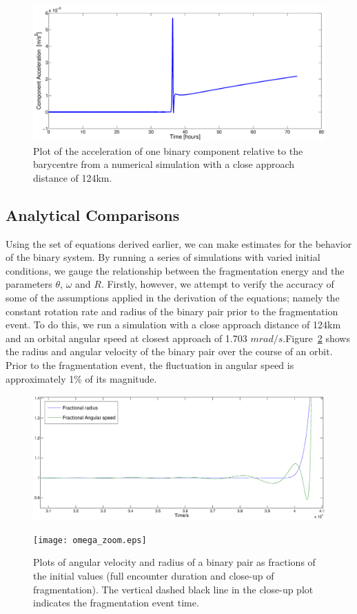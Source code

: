 \documentclass[letterpaper, preprint, paper,11pt]{AAS}	%
\begin{document}
 \begin{figure}[H]
\centering
\centerline{\includegraphics[width=1.2\textwidth]{peak_accel.eps}} 
\caption{Plot of the acceleration of one binary component relative to the barycentre from a numerical simulation
 with a close approach distance of 124km.} 
\label{fig:Num_accell}
\end{figure}

\subsection{Analytical Comparisons}

Using the set of equations derived earlier, we can make estimates for the behavior of the binary system. By running a series of simulations with varied initial conditions, we gauge the relationship between the fragmentation energy and the parameters $\theta$, $\omega$ and $R$. Firstly, however, we attempt to verify the accuracy of some of the assumptions applied in the derivation of the equations; namely the constant rotation rate and radius of the binary pair prior to the fragmentation event. To do this, we run a simulation with a close approach distance of 124km and an orbital angular speed at closest approach of 1.703 $mrad/s$.Figure~\ref{fig:omega} shows the radius and angular velocity of the binary pair over the course of an orbit. Prior to the fragmentation event, the fluctuation in angular speed is approximately 1\% of its magnitude.

\begin{figure}
\centering
\centerline{\includegraphics[width=1.1\textwidth]{omega.eps}} 
\centerline{\texttt{[image: omega\_zoom.eps]}} 
\caption{Plots of angular velocity and radius of a binary pair as fractions of the initial values (full encounter duration and close-up of fragmentation). The vertical dashed black line in the close-up plot indicates the fragmentation event time.} 
\label{fig:omega}
\end{figure}
\end{document}
